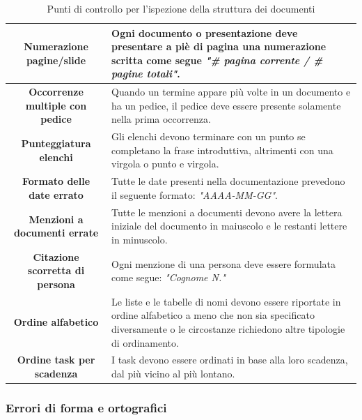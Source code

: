 \documentclass[10pt, a4paper]{article}
\begin{document}
\begin{table}[H]
\begin{xltabular}{\textwidth}{c|X}
\hline
\textbf{Numerazione pagine/slide} & Ogni documento o presentazione deve presentare a piè di pagina una numerazione scritta come segue \textit{"\# pagina corrente / \# pagine totali"}.\\
\hline
\textbf{Occorrenze multiple con pedice} & Quando un termine appare più volte in un documento e ha un pedice, il pedice deve essere presente solamente nella prima occorrenza.\\
\hline
\textbf{Punteggiatura elenchi} & Gli elenchi devono terminare con un punto se completano la frase introduttiva, altrimenti con una virgola o punto e virgola.\\
\hline
\textbf{Formato delle date errato} & Tutte le date presenti nella documentazione prevedono il seguente formato: \textit{"AAAA-MM-GG"}.\\
\hline
\textbf{Menzioni a documenti errate} & Tutte le menzioni a documenti devono avere la lettera iniziale del documento in maiuscolo e le restanti lettere in minuscolo.\\
\hline
\textbf{Citazione scorretta di persona }& Ogni menzione di una persona deve essere formulata come segue: \textit{"Cognome N."} \\
\hline
\textbf{Ordine alfabetico} & Le liste e le tabelle di nomi devono essere riportate in ordine alfabetico a meno che non sia specificato diversamente o le circostanze richiedono altre tipologie di ordinamento.\\
\hline
\textbf{Ordine task per scadenza} & I task devono essere ordinati in base alla loro scadenza, dal più vicino al più lontano.\\

\end{xltabular}
\caption{Punti di controllo per l'ispezione della struttura dei documenti}
\end{table}


\subsubsection{Errori di forma e ortografici}
\end{document}
